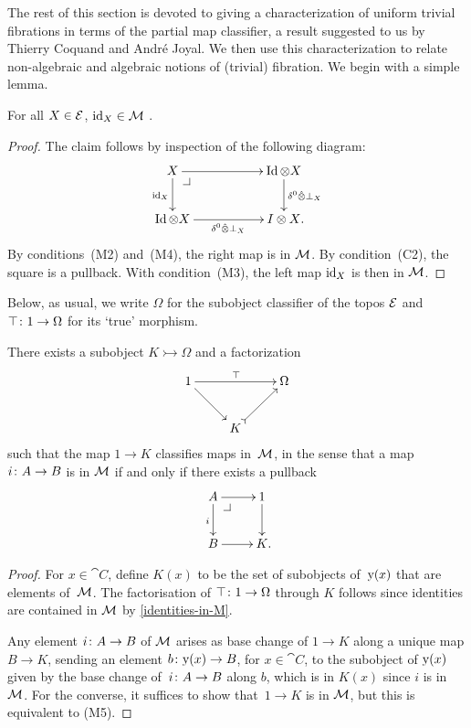 \documentclass[reqno,10pt,a4paper,oneside,draft]{amsart}
\begin{document}
{{The rest of this section is devoted to giving a characterization of uniform trivial fibrations in terms of the partial map classifier, a result suggested to us by Thierry Coquand and Andr\'e Joyal.
We then use this characterization to relate non-algebraic and algebraic notions of (trivial) fibration.
We begin with a simple lemma.

\begin{lemma} \label{identities-in-M}
For all $X \in \cal{E}$, $\id_X \in \cal{M}$ .
\end{lemma}

\begin{proof}
The claim follows by inspection of the following diagram:
\[
\xymatrix@C+3em{
  X
  \ar[r]
  \ar[d]_{\id_X}
  \pullback{dr}
&
  \Id \otimes X
  \ar[d]^{\delta^0 \hatotimes \bot_X}
\\
  \Id \otimes X
  \ar[r]_{\delta^0 \hatotimes \bot_X}
&
  I \otimes X
\rlap{.}}
\]
By conditions~(M2) and~(M4), the right map is in $\cal{M}$.
By condition~(C2), the square is a pullback.
With condition~(M3), the left map $\id_X$ is then in $\cal{M}$.
\end{proof}

Below, as usual, we write $\Omega$ for the subobject classifier of the topos $\cal{E}$ and $\top \co 1 \to \Omega$ for its `true' morphism.

\begin{lemma} \label{partial-map-classifier}
There exists a subobject $K \rightarrowtail \Omega$ and a factorization
\[
\xymatrix{
  1
  \ar[rr]^\top
  \ar[dr]
&&
  \Omega
\\
&
  K
  \ar@{>->}[ur]
}
\]
such that the map $1 \to K$ classifies maps in~$\cal{M}$, in the sense that a map
$i \co A \to B$ is in $\cal{M}$ if and only if there exists a pullback
\[
\xymatrix{
  A
  \ar[r]
  \ar[d]_i
  \drpullback
&
  1
  \ar[d]
\\
  B
  \ar[r]
&
  K
\rlap{.}}
\]
\end{lemma}

\begin{proof}
For $x \in \cat{C}$, define $K(x)$ to be the set of subobjects of~$\yon(x)$ that are elements of~$\cal{M}$.
The factorisation of $\top \co 1 \to \Omega$ through $K$ follows since identities are contained in $\cal{M}$ by \cref{identities-in-M}.

Any element $i \co A \to B$ of $\cal{M}$ arises as base change of $1 \to K$ along a unique map $B \to K$, sending an element $b \co \yon(x) \to B$, for $x \in \cat{C}$, to the subobject of $\yon(x)$ given by the base change of~$i \co A  \to B$ along $b$, which is in $K(x)$ since $i$ is in $\cal{M}$.
For the converse, it suffices to show that~$1 \to K$ is in $\cal{M}$, but this is equivalent to (M5).
\end{proof}

}}
\end{document}
